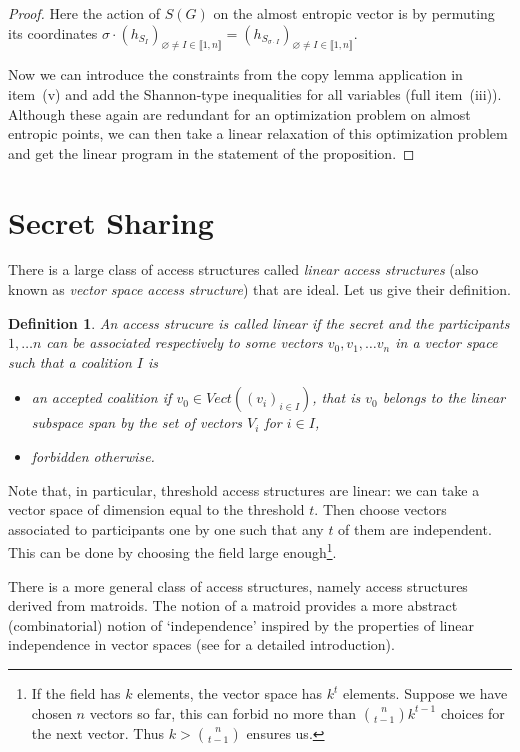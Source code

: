 \documentclass[11pt, a4paper]{kybernetika}
\newtheorem{definition}[theorem]{Definition}
\begin{document}
\begin{proof}
		Here the action of $S(G)$ on the almost entropic vector is by permuting its coordinates $\sigma\cdot(h_{S_I})_{\varnothing\neq I\in\llbracket1,n\rrbracket}=(h_{S_{\sigma\cdot I}})_{\varnothing\neq I\in\llbracket1,n\rrbracket}$.
		
		Now we can introduce the constraints from the copy lemma application in item~(v) and add the Shannon-type inequalities for all variables (full item~(iii)). Although these again are redundant for an optimization problem on almost entropic points, we can then take a linear relaxation of this optimization problem and get the linear program in the statement of the proposition.
		
	\end{proof} 
	
	\section{Secret Sharing}\label{ch:ss}
	
	There is a large class of access structures called \emph{linear access structures} (also known as \emph{vector space access structure}) that are ideal. Let us give their definition.
	
	\begin{definition}
		An access strucure is called \emph{linear} if the secret and the participants $1,\ldots n$ can be associated respectively to some vectors $v_0, v_1, \ldots v_n$ in a vector space such that a coalition $I$ is
		\begin{itemize}
			\item an accepted coalition if $v_0\in Vect((v_i)_{i\in I})$, that is $v_0$ belongs to the linear subspace span by the set of vectors $V_i$ for $i\in I$,
			\item forbidden otherwise.
		\end{itemize}
	\end{definition}

	Note that, in particular, threshold access structures are linear: we can take a vector space of dimension equal to the threshold $t$. Then choose vectors associated to participants one by one such that any $t$ of them are independent. This can be done by choosing the field large enough\footnote{If the field has $k$ elements, the vector space has $k^t$ elements. Suppose we have chosen $n$ vectors so far, this can forbid no more than $\binom n{t-1}k^{t-1}$ choices for the next vector. Thus $k>\binom n{t-1}$ ensures us.}.
	
	There is a more general class of access structures, namely access structures derived from matroids. The notion of a matroid provides a more abstract (combinatorial) notion of `independence' inspired by the properties of linear independence in vector spaces (see \cite{oxley1992matroid} for a detailed introduction).
	
\end{document}
